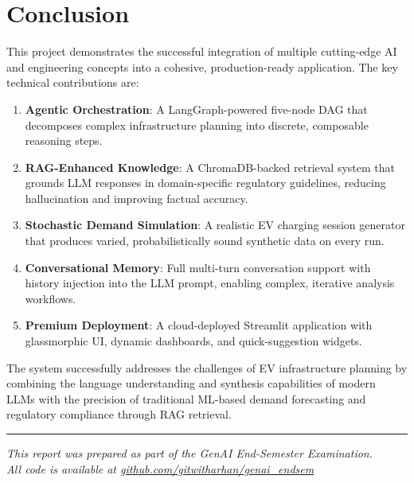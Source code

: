 \documentclass[12pt,a4paper]{article}
\begin{document}
\section{Conclusion}

This project demonstrates the successful integration of multiple cutting-edge AI and engineering concepts into a cohesive, production-ready application. The key technical contributions are:

\begin{enumerate}
    \item \textbf{Agentic Orchestration}: A LangGraph-powered five-node DAG that decomposes complex infrastructure planning into discrete, composable reasoning steps.
    \item \textbf{RAG-Enhanced Knowledge}: A ChromaDB-backed retrieval system that grounds LLM responses in domain-specific regulatory guidelines, reducing hallucination and improving factual accuracy.
    \item \textbf{Stochastic Demand Simulation}: A realistic EV charging session generator that produces varied, probabilistically sound synthetic data on every run.
    \item \textbf{Conversational Memory}: Full multi-turn conversation support with history injection into the LLM prompt, enabling complex, iterative analysis workflows.
    \item \textbf{Premium Deployment}: A cloud-deployed Streamlit application with glassmorphic UI, dynamic dashboards, and quick-suggestion widgets.
\end{enumerate}

The system successfully addresses the challenges of EV infrastructure planning by combining the language understanding and synthesis capabilities of modern LLMs with the precision of traditional ML-based demand forecasting and regulatory compliance through RAG retrieval.

\vspace{1cm}
\noindent\rule{\textwidth}{0.4pt}
\begin{center}
    {\small\textit{This report was prepared as part of the GenAI End-Semester Examination.}}\\
    {\small\textit{All code is available at \href{https://github.com/gitwitharhan/genai_endsem}{github.com/gitwitharhan/genai\_endsem}}}
\end{center}
\end{document}

